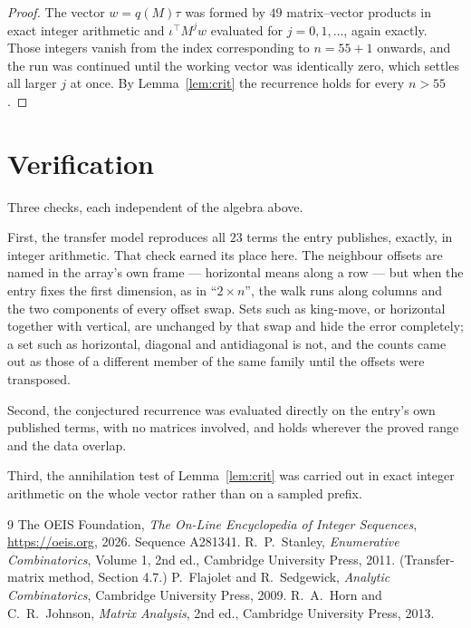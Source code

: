 \documentclass[11pt,a4paper]{article}
\theoremstyle{plain}
\theoremstyle{definition}
\begin{document}
\begin{proof}
The vector $w=q(M)\tau$ was formed by $49$ matrix--vector products in exact integer
arithmetic and $\iota^{\!\top}M^{j}w$ evaluated for $j=0,1,\dots$, again exactly. Those
integers vanish from the index corresponding to $n=55+1$ onwards, and the run was
continued until the working vector was identically zero, which settles all larger $j$ at once.
By Lemma~\ref{lem:crit} the recurrence holds for every $n>55$.
\end{proof}

\section{Verification}

Three checks, each independent of the algebra above.

First, the transfer model reproduces all $23$ terms the entry publishes, exactly, in
integer arithmetic. That check earned its place here. The neighbour offsets are named in the
array's own frame --- horizontal means along a row --- but when the entry fixes the first
dimension, as in ``$2\times n$'', the walk runs along columns and the two components of every
offset swap. Sets such as king-move, or horizontal together with vertical, are unchanged by
that swap and hide the error completely; a set such as horizontal, diagonal and antidiagonal
is not, and the counts came out as those of a different member of the same family until the
offsets were transposed.

Second, the conjectured recurrence was evaluated directly on the entry's own published terms,
with no matrices involved, and holds wherever the proved range and the data overlap.

Third, the annihilation test of Lemma~\ref{lem:crit} was carried out in exact integer
arithmetic on the whole vector rather than on a sampled prefix.

\begin{thebibliography}{9}
 The OEIS Foundation, \emph{The On-Line Encyclopedia of Integer
Sequences}, \url{https://oeis.org}, 2026. Sequence A281341.
 R.~P.~Stanley, \emph{Enumerative Combinatorics}, Volume 1, 2nd ed.,
Cambridge University Press, 2011. (Transfer-matrix method, Section 4.7.)
 P.~Flajolet and R.~Sedgewick, \emph{Analytic Combinatorics}, Cambridge
University Press, 2009.
 R.~A.~Horn and C.~R.~Johnson, \emph{Matrix Analysis}, 2nd ed., Cambridge
University Press, 2013.
\end{thebibliography}
\end{document}

